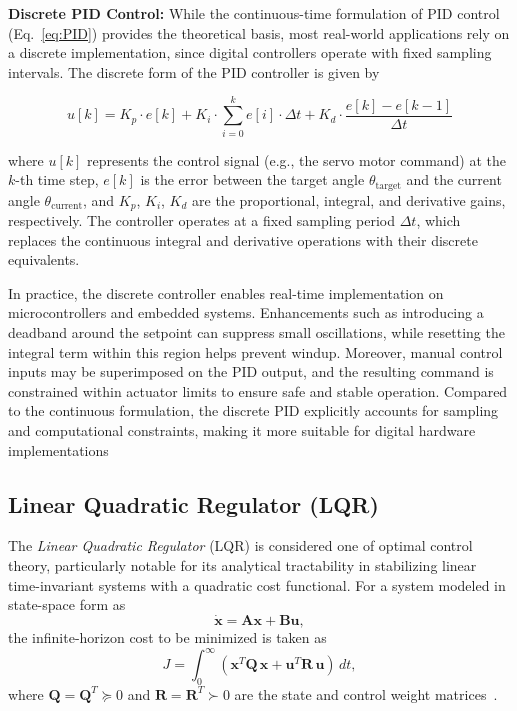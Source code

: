 \documentclass[english, bachelor, utf8]{base/thesis_telematics}
\begin{document}
\textbf{Discrete PID Control:}  
While the continuous-time formulation of PID control (Eq.~\ref{eq:PID}) provides the theoretical basis, most real-world applications rely on a discrete implementation, since digital controllers operate with fixed sampling intervals. The discrete form of the PID controller is given by

\begin{equation}
u[k] = K_p \cdot e[k] + K_i \cdot \sum_{i=0}^{k} e[i] \cdot \Delta t + K_d \cdot \frac{e[k] - e[k-1]}{\Delta t}
\label{eq:pid_control}
\end{equation}

where $u[k]$ represents the control signal (e.g., the servo motor command) at the $k$-th time step, $e[k]$ is the error between the target angle $\theta_{\text{target}}$ and the current angle $\theta_{\text{current}}$, and $K_p$, $K_i$, $K_d$ are the proportional, integral, and derivative gains, respectively. The controller operates at a fixed sampling period $\Delta t$, which replaces the continuous integral and derivative operations with their discrete equivalents.

In practice, the discrete controller enables real-time implementation on microcontrollers and embedded systems. Enhancements such as introducing a deadband around the setpoint can suppress small oscillations, while resetting the integral term within this region helps prevent windup. Moreover, manual control inputs may be superimposed on the PID output, and the resulting command is constrained within actuator limits to ensure safe and stable operation. Compared to the continuous formulation, the discrete PID explicitly accounts for sampling and computational constraints, making it more suitable for digital hardware implementations

\subsection{Linear Quadratic Regulator (LQR)}

The \textit{Linear Quadratic Regulator} (LQR) is considered one of optimal control theory, particularly notable for its analytical tractability in stabilizing linear time-invariant systems with a quadratic cost functional. For a system modeled in state-space form as
\[
\dot{\mathbf{x}} = \mathbf{A} \mathbf{x} + \mathbf{B} \mathbf{u},
\]
the infinite-horizon cost to be minimized is taken as
\[
J = \int_{0}^{\infty} \left( \mathbf{x}^{T} \mathbf{Q} \, \mathbf{x} + \mathbf{u}^{T} \mathbf{R} \, \mathbf{u} \right) \, dt,
\]
where \(\mathbf{Q} = \mathbf{Q}^{T} \succeq 0\) and \(\mathbf{R} = \mathbf{R}^{T} \succ 0\) are the state and control weight matrices~\cite{underactuatedLQR}.
\end{document}
